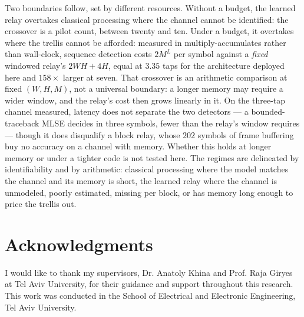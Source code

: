 Two boundaries follow, set by different resources. Without a budget, the learned relay overtakes classical processing where the channel cannot be identified: the crossover is a pilot count, between twenty and ten. Under a budget, it overtakes where the trellis cannot be afforded: measured in multiply-accumulates rather than wall-clock, sequence detection costs $2M^{L}$ per symbol against a \emph{fixed} windowed relay's $2WH+4H$, equal at $3.35$ taps for the architecture deployed here and $158\times$ larger at seven. That crossover is an arithmetic comparison at fixed $(W,H,M)$, not a universal boundary: a longer memory may require a wider window, and the relay's cost then grows linearly in it. On the three-tap channel measured, latency does not separate the two detectors --- a bounded-traceback MLSE decides in three symbols, fewer than the relay's window requires --- though it does disqualify a block relay, whose $202$ symbols of frame buffering buy no accuracy on a channel with memory. Whether this holds at longer memory or under a tighter code is not tested here. The regimes are delineated by identifiability and by arithmetic: classical processing where the model matches the channel and its memory is short, the learned relay where the channel is unmodeled, poorly estimated, missing per block, or has memory long enough to price the trellis out.


\clearpage

\cleardoublepage
{}
\chapter*{Acknowledgments}

I would like to thank my supervisors, Dr. Anatoly Khina and Prof. Raja Giryes at Tel Aviv University, for their guidance and support throughout this research.
This work was conducted in the School of Electrical and Electronic Engineering, Tel Aviv University.
